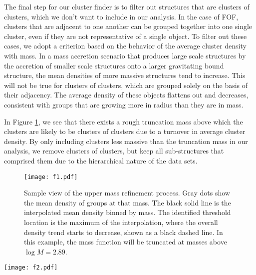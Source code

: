 \documentclass[iop]{emulateapj}
\begin{document}
\par The final step for our cluster finder is to filter out structures that are clusters of clusters, which we don't want to include in our analysis. 
In the case of FOF, clusters that are adjacent to one another can be grouped together into one single cluster, even if they are not representative of a single object.  
To filter out these cases, we adopt a criterion based on the behavior of the average cluster density with mass. In a mass accretion scenario that produces large scale structures by the accretion of smaller scale structures onto a larger gravitating bound structure, the mean densities of more massive structures tend to increase. This will not be true for clusters of clusters, which are grouped solely on the basis of their adjacency. The average density of these objects flattens out and decreases, consistent with groups that are growing more in radius than they are in mass. 
 \par In Figure \ref{fig:denref}, we see that there exists a rough truncation mass above which the clusters are likely to be clusters of clusters due to a turnover in average cluster density. By only including clusters less massive than the truncation mass in our analysis, we remove clusters of clusters, but keep all sub-structures that comprised them due to the hierarchical nature of the data sets. 

\begin{figure}[h!]
    \centering
    \texttt{[image: f1.pdf]}
    \caption{Sample view of the upper mass refinement process. Gray dots show the mean density of groups at that mass. The black solid line is the interpolated mean density binned by mass. The identified threshold location is the maximum of the interpolation, where the overall density trend starts to decrease, shown as a black dashed line. In this example, the mass function will be truncated at masses above $\log M = 2.89$.}
	\label{fig:denref}
\end{figure}

\begin{figure*}[t]
    \centering
    \texttt{[image: f2.pdf]}
    \caption{Thick slice of a central box $0.4 R \times 0.4 R \times 0.2 R$ in volume, where clusters are color coded by mass.  In units of initial free-fall time, panels a)-c) are taken at t = 0.8, 1.0, and 1.3. Scaling to typical molecular cloud values, the time between panels is $\Delta t = 2.74 \mathrm{Myr}$.}
    \label{fig:progression}
\end{figure*} 
\end{document}

